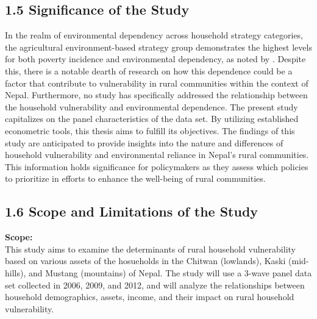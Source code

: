 \subsection*{1.5 Significance of the Study}
\renewcommand{\thepage}{\arabic{page}}
In the realm of environmental dependency across household strategy categories, the agricultural environment-based strategy group demonstrates the highest levels for both poverty incidence and environmental dependency, as noted by \cite{walelign2016livelihood}. Despite this, there is a notable dearth of research on how this dependence could be a factor that contribute to vulnerability in rural communities within the context of Nepal. Furthermore, no study has specifically addressed the relationship between the household vulnerability and environmental dependence.
The present study capitalizes on the panel characteristics of the data set. By utilizing established econometric tools, this thesis aims to fulfill its objectives. The findings of this study are anticipated to provide insights into the nature and differences of household vulnerability and environmental reliance in Nepal's rural communities. This information holds significance for policymakers as they assess which policies to prioritize in efforts to enhance the well-being of rural communities.

\subsection*{1.6 Scope and Limitations of the Study}
\renewcommand{\thepage}{\arabic{page}}
\textbf{Scope:}\\
This study aims to examine the determinants of rural household vulnerability based on various assets of the hosueholds in the Chitwan (lowlands), Kaski (mid-hills), and Mustang (mountains)
of Nepal. The study will use a 3-wave panel data set collected in 2006, 2009, and 
2012, and will analyze the relationships between household demographics, assets, 
income, and their impact on rural household vulnerability. \\

